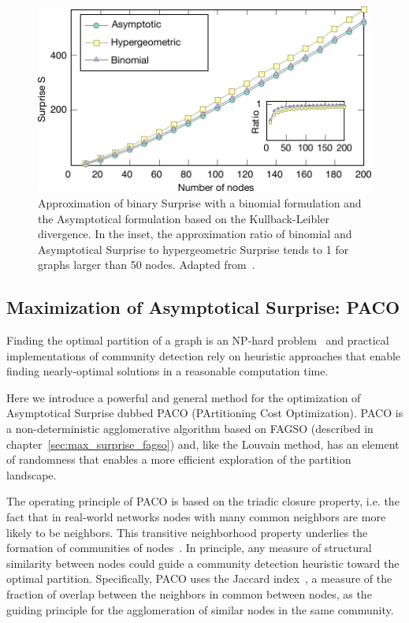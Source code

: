 \begin{figure}[htb!]
\centering
\includegraphics[width=1\textwidth]{images/asymptotical_surprise_comparison.pdf}
\caption{Approximation of binary Surprise with a binomial formulation and the Asymptotical formulation based on the Kullback-Leibler divergence. In the inset, the approximation ratio of binomial and Asymptotical Surprise to hypergeometric Surprise tends to 1 for graphs larger than 50 nodes. Adapted from~\cite{traag2015}.}
\label{fig:asymptotical_surprise_comparison}
\end{figure}


\subsection{Maximization of Asymptotical Surprise: PACO}
Finding the optimal partition of a graph is an NP-hard problem~\cite{fortunato2010} and practical implementations of community detection rely on heuristic approaches that enable finding nearly-optimal solutions in a reasonable computation time.

Here we introduce a powerful and general method for the optimization of Asymptotical Surprise dubbed PACO (PArtitioning Cost Optimization). PACO is a non-deterministic agglomerative algorithm based on FAGSO (described in chapter~\ref{sec:max_surprise_fagso}) and, like the Louvain method, has an element of randomness that enables a more efficient exploration of the partition landscape.

The operating principle of PACO is based on the triadic closure property, i.e. the fact that in real-world networks nodes with many common neighbors are more likely to be neighbors. This transitive neighborhood property underlies the formation of communities of nodes~\cite{bianconi2014,eustace2015}. In principle, any measure of structural similarity between nodes could guide a community detection heuristic toward the optimal partition. Specifically, PACO uses the Jaccard index~\cite{jaccard1901}, a measure of the fraction of overlap between the neighbors in common between nodes, as the guiding principle for the agglomeration of similar nodes in the same community.

